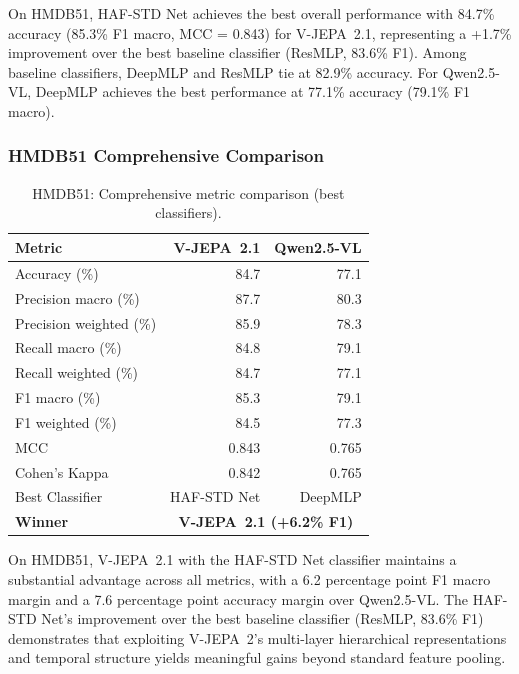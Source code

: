 On HMDB51, HAF-STD Net achieves the best overall performance with 84.7\% accuracy (85.3\% F1 macro, MCC = 0.843) for V-JEPA~2.1, representing a +1.7\% improvement over the best baseline classifier (ResMLP, 83.6\% F1). Among baseline classifiers, DeepMLP and ResMLP tie at 82.9\% accuracy. For Qwen2.5-VL, DeepMLP achieves the best performance at 77.1\% accuracy (79.1\% F1 macro).

\subsubsection{HMDB51 Comprehensive Comparison}

\begin{table}[H]
\centering
\caption{HMDB51: Comprehensive metric comparison (best classifiers).}
\label{tab:hmdb_comparison}
\begin{tabular}{lrr}
\toprule
\textbf{Metric} & \textbf{V-JEPA~2.1} & \textbf{Qwen2.5-VL} \\
\midrule
Accuracy (\%)         & 84.7 & 77.1 \\
Precision macro (\%)  & 87.7 & 80.3 \\
Precision weighted (\%) & 85.9 & 78.3 \\
Recall macro (\%)     & 84.8 & 79.1 \\
Recall weighted (\%)  & 84.7 & 77.1 \\
F1 macro (\%)         & 85.3 & 79.1 \\
F1 weighted (\%)      & 84.5 & 77.3 \\
MCC                   & 0.843 & 0.765 \\
Cohen's Kappa         & 0.842 & 0.765 \\
Best Classifier       & HAF-STD Net & DeepMLP \\
\midrule
\textbf{Winner}       & \multicolumn{2}{c}{\textbf{V-JEPA~2.1 (+6.2\% F1)}} \\
\bottomrule
\end{tabular}
\end{table}

On HMDB51, V-JEPA~2.1 with the HAF-STD Net classifier maintains a substantial advantage across all metrics, with a 6.2 percentage point F1 macro margin and a 7.6 percentage point accuracy margin over Qwen2.5-VL. The HAF-STD Net's improvement over the best baseline classifier (ResMLP, 83.6\% F1) demonstrates that exploiting V-JEPA~2's multi-layer hierarchical representations and temporal structure yields meaningful gains beyond standard feature pooling.


